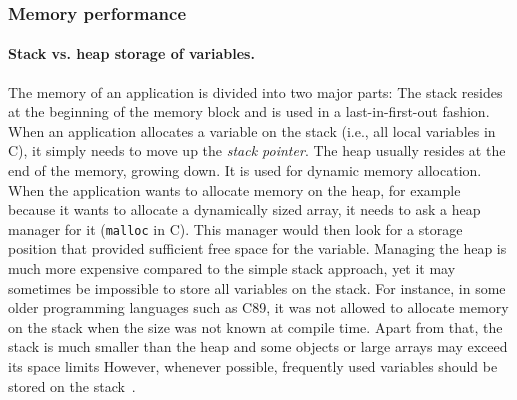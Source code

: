 \subsubsection{Memory performance}
\paragraph{Stack vs. heap storage of variables.} The memory of an application is divided into two major parts: The stack resides at the beginning of the memory block and is used in a last-in-first-out fashion. When an application allocates a variable on the stack (i.e., all local variables in C), it simply needs to move up the \emph{stack pointer}. The heap usually resides at the end of the memory, growing down. It is used for dynamic memory allocation. When the application wants to allocate memory on the heap, for example because it wants to allocate a dynamically sized array, it needs to ask a heap manager for it (\texttt{malloc} in C). This manager would then look for a storage position that provided sufficient free space for the variable. Managing the heap is much more expensive compared to the simple stack approach, yet it may sometimes be impossible to store all variables on the stack. For instance, in some older programming languages such as C89, it was not allowed to allocate memory on the stack when the size was not known at compile time. Apart from that, the stack is much smaller than the heap and some objects or large arrays may exceed its space limits However, whenever possible, frequently used variables should be stored on the stack~\cite[p. 90]{fog2011optimizing}.
